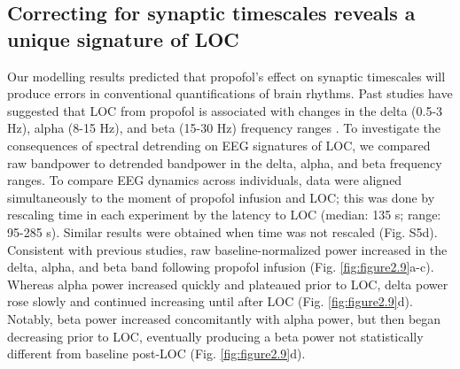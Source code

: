 \subsection{Correcting for synaptic timescales reveals a unique signature of LOC}
Our modelling results predicted that propofol’s effect on synaptic timescales will produce errors in conventional quantifications of brain rhythms. Past studies have suggested that LOC from propofol is associated with changes in the delta (0.5-3 \unit{\hertz}), alpha (8-15 \unit{\hertz}), and beta (15-30 \unit{\hertz}) frequency ranges \cite{Purdon2013}. To investigate the consequences of spectral detrending on EEG signatures of LOC, we compared raw bandpower to detrended bandpower in the delta, alpha, and beta frequency ranges. To compare EEG dynamics across individuals, data were aligned simultaneously to the moment of propofol infusion and LOC; this was done by rescaling time in each experiment by the latency to LOC (median: 135 s; range: 95-285 s). Similar results were obtained when time was not rescaled (Fig. S5d). Consistent with previous studies\cite{Purdon2013}, raw baseline-normalized power increased in the delta, alpha, and beta band following propofol infusion (Fig. \ref{fig:figure2.9}a-c). Whereas alpha power increased quickly and plateaued prior to LOC, delta power rose slowly and continued increasing until after LOC (Fig. \ref{fig:figure2.9}d). Notably, beta power increased concomitantly with alpha power, but then began decreasing prior to LOC, eventually producing a beta power not statistically different from baseline post-LOC (Fig. \ref{fig:figure2.9}d). 




